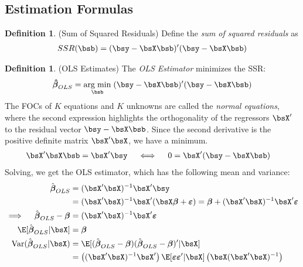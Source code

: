 \documentclass[12pt]{article}
\theoremstyle{plain}
\theoremstyle{definition}
\newtheorem{defn}[thm]{Definition}
\theoremstyle{remark}
\newcommand{\bsvarepsilon}{\boldsymbol{\varepsilon}}
\newcommand{\bsbeta}{\boldsymbol{\beta}}
\newcommand{\bshatbeta}{\boldsymbol{\hat{\beta}}}
\DeclareMathOperator*{\argmin}{arg\;min}
\newcommand{\Var}{\operatorname{Var}}
\begin{document}
\clearpage
\subsection{Estimation Formulas}

\begin{defn}(Sum of Squared Residuals)
Define the \emph{sum of squared residuals} as
\begin{align*}
  SSR(\bsb) = (\bsy - \bsX \bsb)'(\bsy - \bsX \bsb)
\end{align*}
\end{defn}


\begin{defn}(OLS Estimates)
The \emph{OLS Estimator} minimizes the SSR:
\begin{align*}
  \bshatbeta_{OLS}
  =
  \argmin_{\bsb} \;
  (\bsy - \bsX \bsb)'(\bsy - \bsX \bsb)
\end{align*}
The FOCs of $K$ equations and $K$ unknowns are called the
\emph{normal equations}, where the second expression highlights the
orthogonality of the regressors $\bsX'$ to the residual vector
$\bsy-\bsX\bsb$.  Since the second derivative is the positive definite
matrix $\bsX'\bsX$, we have a minimum.
\begin{align*}
  \bsX'\bsX\bsb &= \bsX'\bsy
  \quad\iff\quad
  0= \bsX'(\bsy-\bsX\bsb)
\end{align*}
Solving, we get the OLS estimator, which has the following mean and
variance:
\begin{align*}
  \hat{\bsbeta}_{OLS}
  &= (\bsX'\bsX)^{-1}\bsX'\bsy \\
  &= (\bsX'\bsX)^{-1}\bsX' (\bsX \bsbeta + \bsvarepsilon)
  = \bsbeta + (\bsX'\bsX)^{-1}\bsX' \bsvarepsilon
  \\
  \implies\quad
  \hat{\bsbeta}_{OLS} - \bsbeta
  &= (\bsX'\bsX)^{-1}\bsX' \bsvarepsilon \\
  \E[\hat{\bsbeta}_{OLS}|\bsX]
  &= \bsbeta \\
  \Var(\hat{\bsbeta}_{OLS}|\bsX)
  &=
  \E[(\hat{\bsbeta}_{OLS}-\bsbeta)(\hat{\bsbeta}_{OLS}-\bsbeta)'|\bsX]
  \\
  &=
  \left((\bsX'\bsX)^{-1}\bsX'\right)
  \E[\bsvarepsilon\bsvarepsilon' |\bsX]
  \left(\bsX(\bsX'\bsX)^{-1}\right)

\end{align*}
\end{defn}
\end{document}
